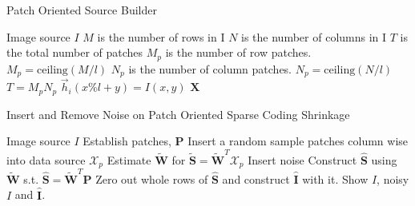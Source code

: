 \documentclass[12pt ]{article}
\begin{document}
\begin{algorithm}
\caption{Patch Oriented Source Builder}
\label{alg:Patch-Oriented-Source-Builder}
\begin{algorithmic}
	\REQUIRE Image source $I$
	\STATE $M$ is the number of rows in I
	\STATE $N$ is the number of columns in I
	\STATE $T$ is the total number of patches
	\STATE $M_p$ is the number of row patches. $M_p = \textrm{ceiling}(M / l)$
	\STATE $N_p$ is the number of column patches. $N_p = \textrm{ceiling}(N / l)$
	\STATE $T = M_p N_p$
				\STATE $\vec{h}_i (x\% l +y) = I(x,y)$
			\ENDFOR
		\ENDFOR 
	\ENDFOR
	\RETURN $\mathbf{X}$
\end{algorithmic}
\end{algorithm}

\begin{algorithm}
\caption{Insert and Remove Noise on Patch Oriented Sparse Coding Shrinkage}
\label{alg:patch-oriented-sparse-coding-shrinkage-with-source}
\begin{algorithmic}
	\REQUIRE Image source $I$
	\STATE Establish patches, $\mathbf{P}$
	\STATE Insert a random sample patches column wise into data source $\mathbf{\mathcal{X}}_p$
	\STATE Estimate $\mathbf{\tilde{W}}$ for $\mathbf{\tilde{S}} = \mathbf{\tilde{W}}^T \mathbf{\mathcal{X}}_p$
	\STATE Insert noise
	\STATE Construct $\mathbf{\hat{S}}$ using $\mathbf{\tilde{W}}$ s.t. $\mathbf{\hat{S}} = \mathbf{\tilde{W}}^T \mathbf{P}$
	\STATE Zero out whole rows of $\mathbf{\hat{S}}$ and construct $\mathbf{\hat{I}}$ with it. 
	\STATE Show $I$, noisy $I$ and $\mathbf{\hat{I}}$.
\end{algorithmic}
\end{algorithm}
\end{document}
